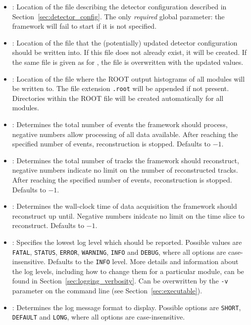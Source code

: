 \begin{itemize}
\item {}: Location of the file describing the detector configuration described in Section~\ref{sec:detector_config}.
The only \textit{required} global parameter: the framework will fail to start if it is not specified.
\item {}: Location of the file that the (potentially) updated detector configuration should be written into. If this file does not already exist, it will be created. If the same file is given as for , the file is overwritten with the updated values.
\item {}: Location of the file where the ROOT output histograms of all modules will be written to. The file extension \texttt{.root} will be appended if not present. Directories within the ROOT file will be created automatically for all modules.
\item {}: Determines the total number of events the framework should process, negative numbers allow processing of all data available.
After reaching the specified number of events, reconstruction is stopped.
Defaults to $-1$.
\item {}: Determines the total number of tracks the framework should reconstruct, negative numbers indicate no limit on the number of reconstructed tracks.
After reaching the specified number of events, reconstruction is stopped.
Defaults to $-1$.
\item {}: Determines the wall-clock time of data acquisition the framework should reconstruct up until. Negative numbers inidcate no limit on the time slice to reconstruct.
Defaults to $-1$.
\item {}: Specifies the lowest log level which should be reported.
Possible values are \texttt{FATAL}, \texttt{STATUS}, \texttt{ERROR}, \texttt{WARNING}, \texttt{INFO} and \texttt{DEBUG}, where all options are case-insensitive.
Defaults to the \texttt{INFO} level.
More details and information about the log levels, including how to change them for a particular module, can be found in Section~\ref{sec:logging_verbosity}.
Can be overwritten by the \texttt{-v} parameter on the command line (see Section~\ref{sec:executable}).
\item {}: Determines the log message format to display.
Possible options are \texttt{SHORT}, \texttt{DEFAULT} and \texttt{LONG}, where all options are case-insensitive.

\end{itemize}
